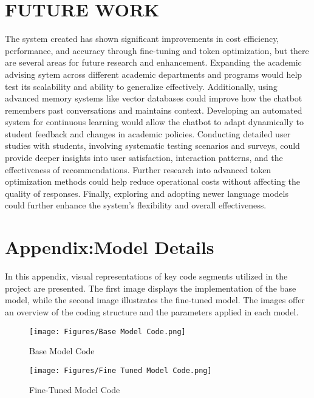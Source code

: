 \documentclass[12pt,oneside,openany]{report}
\begin{document}
\chapter{FUTURE WORK}
The system created has shown significant improvements in cost efficiency, performance, and accuracy through fine-tuning and token optimization, but there are several areas for future research and enhancement. Expanding the academic advising sytem across different academic departments and programs would help test its scalability and ability to generalize effectively. Additionally, using advanced memory systems like vector databases could improve how the chatbot remembers past conversations and maintains context. Developing an automated system for continuous learning would allow the chatbot to adapt dynamically to student feedback and changes in academic policies. Conducting detailed user studies with students, involving systematic testing scenarios and surveys, could provide deeper insights into user satisfaction, interaction patterns, and the effectiveness of recommendations. Further research into advanced token optimization methods could help reduce operational costs without affecting the quality of responses. Finally, exploring and adopting newer language models could further enhance the system's flexibility and overall effectiveness.








\appendix


\chapter{Appendix:Model Details}

In this appendix, visual representations of key code segments utilized in the project are presented. The first image displays the implementation of the base model, while the second image illustrates the fine-tuned model. The images offer an overview of the coding structure and the parameters applied in each model.

\begin{figure}[H]
    \centering
    \texttt{[image: Figures/Base Model Code.png]}
    \caption{Base Model Code}
    \label{fig:base_model_code}
\end{figure}

\begin{figure}[H]
    \centering
    \texttt{[image: Figures/Fine Tuned Model Code.png]}
    \caption{Fine-Tuned Model Code}
    \label{fig:fine_tuned_model_code}
\end{figure}
\end{document}
